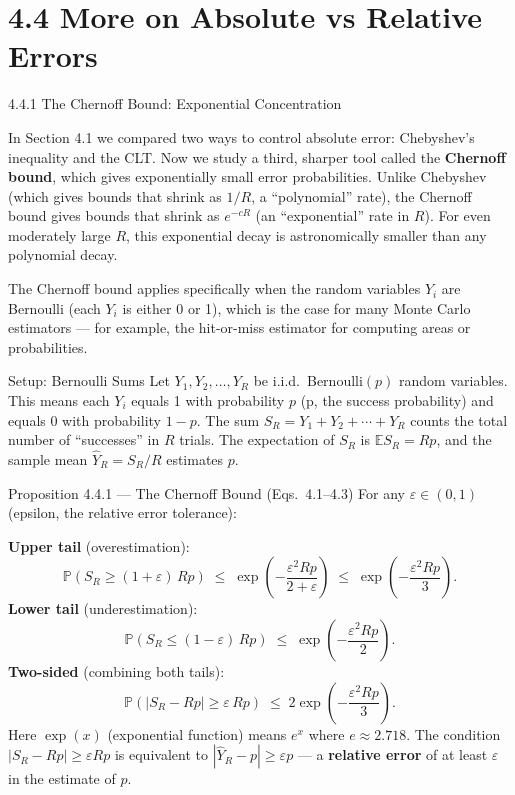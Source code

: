 \documentclass[aspectratio=169,10pt]{beamer}
\begin{document}

\section{4.4 More on Absolute vs Relative Errors}

\begin{frame}[allowframebreaks]{4.4.1 The Chernoff Bound: Exponential Concentration}

In Section 4.1 we compared two ways to control absolute error: Chebyshev's
inequality and the CLT.  Now we study a third, sharper tool called the
\textbf{Chernoff bound}, which gives exponentially small error probabilities.
Unlike Chebyshev (which gives bounds that shrink as $1/R$, a ``polynomial'' rate),
the Chernoff bound gives bounds that shrink as $e^{-cR}$ (an ``exponential'' rate
in $R$).  For even moderately large $R$, this exponential decay is astronomically
smaller than any polynomial decay.

The Chernoff bound applies specifically when the random variables $Y_i$ are
Bernoulli (each $Y_i$ is either 0 or 1), which is the case for many Monte Carlo
estimators --- for example, the hit-or-miss estimator for computing areas or
probabilities.

\begin{block}{Setup: Bernoulli Sums}
  Let $Y_1, Y_2, \ldots, Y_R$ be i.i.d.\ Bernoulli$(p)$ random variables.
  This means each $Y_i$ equals 1 with probability $p$ (p, the success probability)
  and equals 0 with probability $1-p$.  The sum $S_R = Y_1 + Y_2 + \cdots + Y_R$
  counts the total number of ``successes'' in $R$ trials.  The expectation of $S_R$
  is $\mathbb{E}S_R = Rp$, and the sample mean $\hat{Y}_R = S_R/R$ estimates $p$.
\end{block}

\begin{block}{Proposition 4.4.1 --- The Chernoff Bound (Eqs.\ 4.1--4.3)}
  For any $\varepsilon \in (0, 1)$ (epsilon, the relative error tolerance):

  \textbf{Upper tail} (overestimation):
  \[
    \mathbb{P}(S_R \geq (1+\varepsilon)\,Rp)
      \;\leq\; \exp\!\left(-\frac{\varepsilon^2 Rp}{2+\varepsilon}\right)
      \;\leq\; \exp\!\left(-\frac{\varepsilon^2 Rp}{3}\right). \tag{4.1}
  \]
  \textbf{Lower tail} (underestimation):
  \[
    \mathbb{P}(S_R \leq (1-\varepsilon)\,Rp)
      \;\leq\; \exp\!\left(-\frac{\varepsilon^2 Rp}{2}\right). \tag{4.2}
  \]
  \textbf{Two-sided} (combining both tails):
  \[
    \mathbb{P}\!\left(|S_R - Rp| \geq \varepsilon\,Rp\right)
      \;\leq\; 2\exp\!\left(-\frac{\varepsilon^2 Rp}{3}\right). \tag{4.3}
  \]
  Here $\exp(x)$ (exponential function) means $e^x$ where $e \approx 2.718$.
  The condition $|S_R - Rp| \geq \varepsilon Rp$ is equivalent to
  $|\hat{Y}_R - p| \geq \varepsilon p$ --- a \textbf{relative error} of at
  least $\varepsilon$ in the estimate of $p$.
\end{block}


\end{frame}
\end{document}
